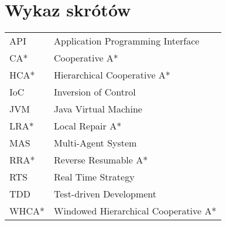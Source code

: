 \chapter*{Wykaz skrótów}

\begin{tabular}{l l}
API & Application Programming Interface \\
CA* & Cooperative A* \\
HCA* & Hierarchical Cooperative A* \\
IoC & Inversion of Control \\
JVM & Java Virtual Machine \\
LRA* & Local Repair A* \\
MAS & Multi-Agent System \\
RRA* & Reverse Resumable A* \\
RTS & Real Time Strategy \\
TDD & Test-driven Development \\
WHCA* & Windowed Hierarchical Cooperative A* \\

\end{tabular}
